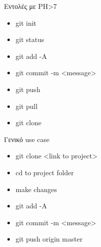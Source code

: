 \documentclass{beamer}
\begin{document}
\begin{frame}{Εντολές με PH>7}
\begin{itemize}
 \item git init
 \item git status
 \item git add -A
 \item git commit -m <message>
 \item git push
 \item git pull
 \item git clone
\end{itemize}
\end{frame}

\begin{frame}{Γενικό use case}
\begin{itemize}
  \item git clone <link to project>
  \item cd to project folder
  \item make changes
  \item git add -A
  \item git commit -m <message>
  \item git push origin master
\end{itemize}
\end{frame}
\end{document}
